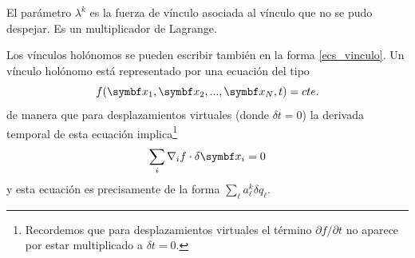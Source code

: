 \documentclass[10pt,oneside]{CBFT_book}
\begin{document}
El parámetro $ \lambda^k $ es la fuerza de vínculo asociada al vínculo que no se pudo despejar. Es un multiplicador de
Lagrange.

Los vínculos holónomos se pueden escribir también en la forma \eqref{ecs_vinculo}. Un vínculo holónomo está representado
por una ecuación del tipo 
\[
	f( \vb{x}_1, \vb{x}_2, ...,\vb{x}_N, t ) = cte.
\]
de manera que para desplazamientos virtuales (donde $\delta t=0$) la derivada temporal de esta ecuación implica\footnote{Recordemos
que para desplazamientos virtuales el término $\partial f /\partial t$ no aparece por estar multiplicado a $\delta t=0$.} 
\[
	\sum_i \nabla_i f \cdot \delta\vb{x}_i = 0
\]
y esta ecuación es precisamente de la forma $ \sum_\ell a_\ell^k \delta q_\ell $.
\end{document}
